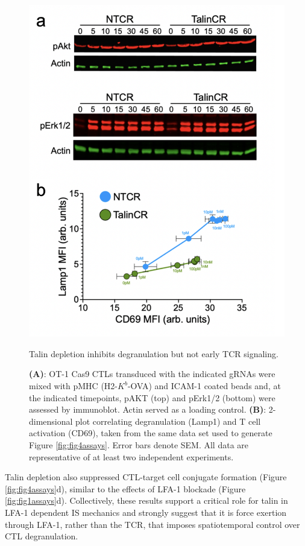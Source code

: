\begin{figure}[htbp]
	\centering
	\includegraphics[width=0.8\columnwidth]{../figures/chapter3/fig4activation.png}
	\caption{Talin depletion inhibits degranulation but not early TCR signaling.}
	\caption*{\textbf{(A)}: OT-1 Cas9 CTLs transduced with the indicated gRNAs were mixed with pMHC (H2-$K^{b}$-OVA) and ICAM-1 coated beads and, at the indicated timepoints, pAKT (top) and pErk1/2 (bottom) were assessed by immunoblot. Actin served as a loading control. \textbf{(B)}: 2-dimensional plot correlating degranulation (Lamp1) and T cell activation (CD69), taken from the same data set used to generate Figure \ref{fig:fig4assays}. Error bars denote SEM. All data are representative of at least two independent experiments.}
	\label{fig:fig4activation}
\end{figure} 

Talin depletion also suppressed CTL-target cell conjugate formation (Figure \ref{fig:fig4assays}d), similar to the effects of LFA-1 blockade (Figure \ref{fig:fig1assays}d). Collectively, these results support a critical role for talin in LFA-1 dependent IS mechanics and strongly suggest that it is force exertion through LFA-1, rather than the TCR, that imposes spatiotemporal control over CTL degranulation.

